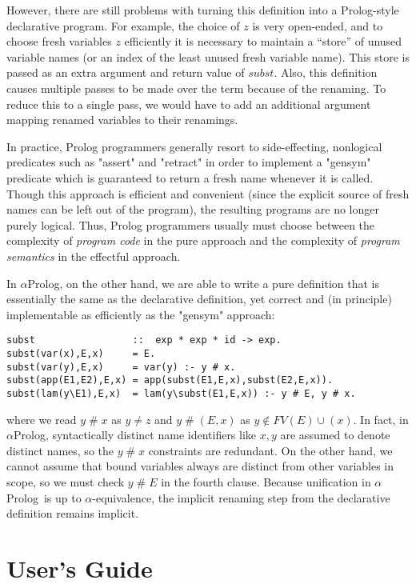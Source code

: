 \documentclass[draft,12pt]{report}
\newcommand{\aprolog}{$\alpha${Prolog}\xspace}
\newcommand{\fresh}{\mathrel\#}
\begin{document}
However, there are still problems with turning this definition into a
Prolog-style declarative program.  For example, the choice of $z$ is
very open-ended, and to choose fresh variables $z$ efficiently it is
necessary to maintain a ``store'' of unused variable names (or an 
index of the least unused fresh variable name).  This
store is passed as an extra argument and return value of $subst$.
Also, this definition causes multiple passes to be made over the term
because of the renaming.  To reduce this to a single pass, we would
have to add an additional argument mapping renamed variables to their
renamings.  

In practice, Prolog programmers generally resort to 
side-effecting, nonlogical predicates such as "assert" and "retract" 
in order to implement a "gensym" predicate which is guaranteed to 
return a fresh name whenever it is called.  Though this approach is 
efficient and convenient (since the explicit source of fresh names
can be left out of the program), the resulting programs 
are no longer purely logical.  Thus, Prolog programmers usually must choose
between the complexity of \emph{program code} in the pure approach and 
the complexity of \emph{program semantics} in the effectful approach.

In \aprolog, on the other hand, we are able to write a pure definition that
is essentially the same as the declarative definition, yet correct and
(in principle) implementable as efficiently as the "gensym" approach:
\begin{verbatim}
subst                 ::  exp * exp * id -> exp.
subst(var(x),E,x)     = E.
subst(var(y),E,x)     = var(y) :- y # x.
subst(app(E1,E2),E,x) = app(subst(E1,E,x),subst(E2,E,x)).
subst(lam(y\E1),E,x)  = lam(y\subst(E1,E,x)) :- y # E, y # x.
\end{verbatim}
where we read $y \fresh x$ as $y \neq z$ and $y \fresh (E,x)$ as $y
\notin FV(E)\cup(x)$.  In fact, in \aprolog, syntactically distinct
name identifiers like $x,y$ are assumed to denote distinct names, so
the $y\fresh x$ constraints are redundant.  On the other hand, we
cannot assume that bound variables always are distinct from other
variables in scope, so we must check $y \fresh E$ in the fourth
clause.  Because unification in \aprolog\ is up to
$\alpha$-equivalence, the implicit renaming step from the declarative
definition remains implicit.

\part{User's Guide}
\end{document}
